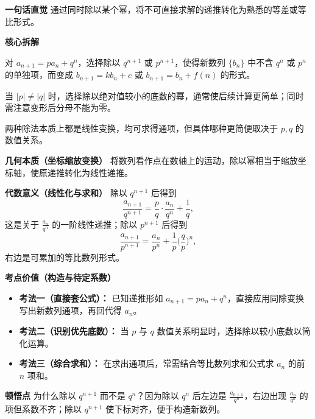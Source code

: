 \begin{explanationbox}
	\textbf{\textcolor{CExplanation}{一句话直觉}}
	通过同时除以某个幂，将不可直接求解的递推转化为熟悉的等差或等比形式。

	\medskip
	\textbf{\textcolor{CExplanation}{核心拆解}}
	\begin{description}[style=nextline, leftmargin=2.8em, labelsep=0.5em, itemsep=0.45em]
		\item[\textbf{要点一（同除构造新数列）：}]
			对 $a_{n+1}=p a_n+q^n$，选择除以 $q^{n+1}$ 或 $p^{n+1}$，使得新数列 $\{b_n\}$ 中不含 $q^n$ 或 $p^n$ 的单独项，而变成 $b_{n+1}=k b_n+c$ 或 $b_{n+1}=b_n+f(n)$ 的形式。
		\item[\textbf{要点二（优先除以较小底数）：}]
			当 $|p|\neq|q|$ 时，选择除以绝对值较小的底数的幂，通常使后续计算更简单；同时需注意变形后分母不能为零。
		\item[\textbf{要点三（两种变形路径等价）：}]
			两种除法本质上都是线性变换，均可求得通项，但具体哪种更简便取决于 $p,q$ 的数值关系。
	\end{description}

	\medskip
	\textbf{\textcolor{CExplanation}{几何本质（坐标缩放变换）}}
	将数列看作点在数轴上的运动，除以幂相当于缩放坐标轴，使原递推转化为线性递推。

	\medskip
	\textbf{\textcolor{CExplanation}{代数意义（线性化与求和）}}
	除以 $q^{n+1}$ 后得到
	\[
		\frac{a_{n+1}}{q^{n+1}}=\frac{p}{q}\cdot\frac{a_n}{q^n}+\frac{1}{q},
	\]
	这是关于 $\frac{a_n}{q^n}$ 的一阶线性递推；除以 $p^{n+1}$ 后得到
	\[
		\frac{a_{n+1}}{p^{n+1}}=\frac{a_n}{p^n}+\frac{1}{p}\Big(\frac{q}{p}\Big)^n,
	\]
	右边是可累加的等比数列形式。

	\medskip
	\textbf{\textcolor{CExplanation}{考点价值（构造与待定系数）}}
	\begin{itemize}[leftmargin=*, itemsep=0.5em, topsep=0.4em]
		\item \textbf{考法一（直接套公式）：} 已知递推形如 $a_{n+1}=pa_n+q^n$，直接应用同除变换写出新数列通项，再回代得 $a_n$。
		\item \textbf{考法二（识别优先底数）：} 当 $p$ 与 $q$ 数值关系明显时，选择除以较小底数以简化运算。
		\item \textbf{考法三（综合求和）：} 在求出通项后，常需结合等比数列求和公式求 $a_n$ 的前 $n$ 项和。
	\end{itemize}

	\medskip
	\textbf{\textcolor{CExplanation}{顿悟点}}
	为什么除以 $q^{n+1}$ 而不是 $q^n$？因为除以 $q^n$ 后左边是 $\frac{a_{n+1}}{q^n}$，右边出现 $\frac{a_n}{q^n}$ 的项但系数不齐；除以 $q^{n+1}$ 使下标对齐，便于构造新数列。


\end{explanationbox}

